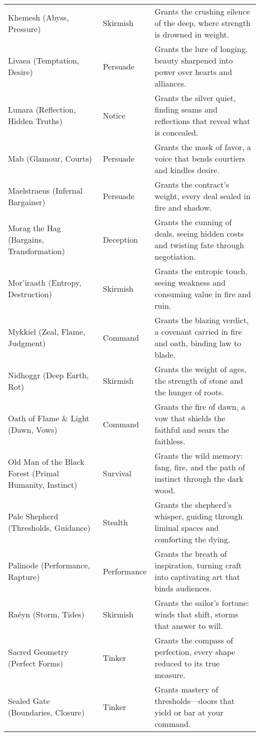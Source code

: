 \begin{table}[H]
\begin{tabular}{@{}p{3.8cm}p{3.8cm}p{7.5cm}@{}}
  Khemesh (Abyss, Pressure) & Skirmish & Grants the crushing silence of the deep, where strength is drowned in weight. \\
  Livaea (Temptation, Desire) & Persuade & Grants the lure of longing, beauty sharpened into power over hearts and alliances. \\
  Lunara (Reflection, Hidden Truths) & Notice & Grants the silver quiet, finding seams and reflections that reveal what is concealed. \\
  Mab (Glamour, Courts) & Persuade & Grants the mask of favor, a voice that bends courtiers and kindles desire. \\
  Maelstraeus (Infernal Bargainer) & Persuade & Grants the contract's weight, every deal sealed in fire and shadow. \\
  Morag the Hag (Bargains, Transformation) & Deception & Grants the cunning of deals, seeing hidden costs and twisting fate through negotiation. \\
  Mor'iraath (Entropy, Destruction) & Skirmish & Grants the entropic touch, seeing weakness and consuming value in fire and ruin. \\
  Mykkiel (Zeal, Flame, Judgment) & Command & Grants the blazing verdict, a covenant carried in fire and oath, binding law to blade. \\
  Nidhoggr (Deep Earth, Rot) & Skirmish & Grants the weight of ages, the strength of stone and the hunger of roots. \\
  Oath of Flame \& Light (Dawn, Vows) & Command & Grants the fire of dawn, a vow that shields the faithful and sears the faithless. \\
  Old Man of the Black Forest (Primal Humanity, Instinct) & Survival & Grants the wild memory: fang, fire, and the path of instinct through the dark wood. \\
  Pale Shepherd (Thresholds, Guidance) & Stealth & Grants the shepherd's whisper, guiding through liminal spaces and comforting the dying. \\
  Palinode (Performance, Rapture) & Performance & Grants the breath of inspiration, turning craft into captivating art that binds audiences. \\
  Raéyn (Storm, Tides) & Skirmish & Grants the sailor's fortune: winds that shift, storms that answer to will. \\
  Sacred Geometry (Perfect Forms) & Tinker & Grants the compass of perfection, every shape reduced to its true measure. \\
  Sealed Gate (Boundaries, Closure) & Tinker & Grants mastery of thresholds—doors that yield or bar at your command. \\

\end{tabular}
\end{table}
